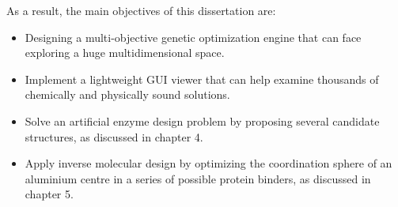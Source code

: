 As a result, the main objectives of this dissertation are:
%
\begin{itemize}

\item Designing a multi-objective genetic optimization engine that can face exploring a huge multidimensional space.

\item Implement a lightweight GUI viewer that can help examine thousands of chemically and physically sound solutions.

\item Solve an artificial enzyme design problem by proposing several candidate structures, as discussed in chapter 4.

\item Apply inverse molecular design by optimizing the coordination sphere of an aluminium centre in a series of possible protein binders, as discussed in chapter 5.

\end{itemize}



